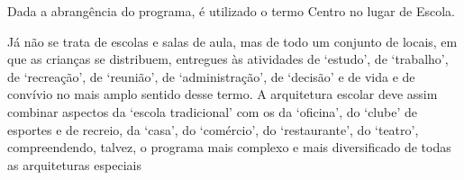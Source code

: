 Dada a abrangência do programa, é utilizado o termo Centro no lugar de Escola.
\begin{citacao}
    Já não se trata de escolas e salas de aula, mas de todo um conjunto de locais,
    em que as crianças se distribuem, entregues às atividades de ‘estudo’, de
    ‘trabalho’, de ‘recreação’, de ‘reunião’, de ‘administração’, de ‘decisão’ e de
    vida e de convívio no mais amplo sentido desse termo. A arquitetura escolar
    deve assim combinar aspectos da ‘escola tradicional’ com os da ‘oficina’,
    do ‘clube’ de esportes e de recreio, da ‘casa’, do ‘comércio’, do
    ‘restaurante’, do ‘teatro’, compreendendo, talvez, o programa mais
    complexo e mais diversificado de todas as arquiteturas especiais
\end{citacao}
